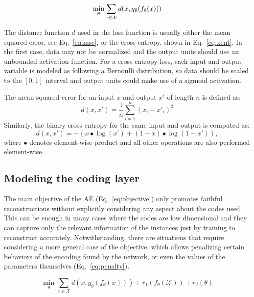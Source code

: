 \begin{equation}\label{eq:objective}
\min_{\theta} \sum_{x\mathbin{\in\mathcal X}}d(x, g_{\theta}(f_{\theta}(x)))
\end{equation}

The distance function $d$ used in the loss function is usually either the mean squared error, see Eq.~\eqref{eq:mse}, or the cross entropy, shown in  Eq.~\eqref{eq:xent}. In the first case, data may not be normalized and the output units should use an unbounded activation function. For a cross entropy loss, each input and output variable is modeled as following a Bernoulli distribution, so data should be scaled to the $[0,1]$ interval and output units could make use of a sigmoid activation.

The mean squared error for an input $x$ and output $x'$ of length $n$ is defined as:
\begin{equation}\label{eq:mse}
    d(x, x') = \frac 1 n\sum_{i=1}^n(x_i - x'_i)^2
\end{equation}
Similarly, the binary cross entropy for the same input and output is computed as:
\begin{equation}\label{eq:xent}
    d(x, x') = - (x \bullet \log(x') + (1-x)\bullet \log(1-x')),
\end{equation}
where $\bullet$ denotes element-wise product and all other operations are also performed element-wise.


\subsection{Modeling the coding layer}\label{sec:modelcode}

The main objective of the AE (Eq.~\ref{eq:objective}) only promotes faithful reconstructions without explicitly considering any aspect about the codes used. This can be enough in many cases where the codes are low dimensional and they can capture only the relevant information of the instances just by training to reconstruct accurately. Notwithstanding, there are situations that require considering a more general case of the objective, which allows penalizing certain behaviors of the encoding found by the network, or even the values of the parameters themselves (Eq.~\ref{eq:penalty}).

\begin{equation}\label{eq:penalty}
    \min_{\theta}\sum_{x\in\mathcal X} d(x,g_{\theta}(f_{\theta}(x)))+r_1(f_{\theta}(\mathcal X))+r_2(\theta)
\end{equation}

